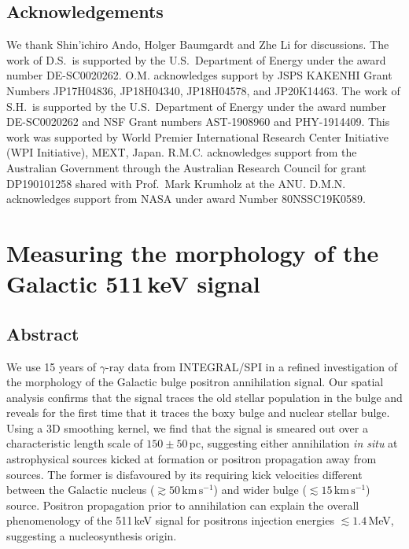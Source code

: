 \documentclass[doublespace,nopageskip]{VTthesis}
\newcommand{\mrm}[1]{\mathrm{#1}}
\begin{document}
\section*{Acknowledgements}
We thank Shin'ichiro Ando, Holger Baumgardt and Zhe Li for discussions. The work of D.S.\ is supported by the U.S.\ Department of Energy under the award number DE-SC0020262. O.M. acknowledges support by JSPS KAKENHI Grant Numbers JP17H04836, JP18H04340, JP18H04578, and JP20K14463. The work of S.H.\ is supported by the U.S.\ Department of Energy under the award number DE-SC0020262 and NSF Grant numbers AST-1908960 and PHY-1914409. This work was supported by World Premier International Research Center Initiative (WPI Initiative), MEXT, Japan. R.M.C. acknowledges support from the Australian Government through the Australian Research Council for grant DP190101258 shared with Prof.~Mark Krumholz at the ANU. D.M.N. acknowledges support from NASA under award Number 80NSSC19K0589.

\chapter{Measuring the morphology of the Galactic 511\,keV signal} \label{ch:511keV}

\section{Abstract}

We use 15 years of $\gamma$-ray data from INTEGRAL/SPI in a refined investigation of the morphology of the Galactic bulge positron annihilation signal.
%
Our spatial analysis confirms that the signal traces the old stellar population in the bulge and reveals for the first time that it traces the 
boxy bulge and nuclear stellar bulge.
%
Using a 3D smoothing kernel, we find that the signal is smeared out over a characteristic length scale of $150 \pm 50$\,pc, suggesting either annihilation \textit{in situ} at astrophysical sources kicked at formation or positron propagation away from sources.
%
The former is disfavoured by its requiring kick velocities different between the Galactic nucleus ($\gtrsim 50\,\mrm{km\,s^{-1}}$) and  wider bulge ($\lesssim 15\,\mrm{km\,s^{-1}}$) source.
%
Positron propagation prior to annihilation can explain the overall phenomenology of the 511\,keV signal for positrons injection energies $\lesssim 1.4$\,MeV, suggesting a nucleosynthesis origin.

\end{document}
